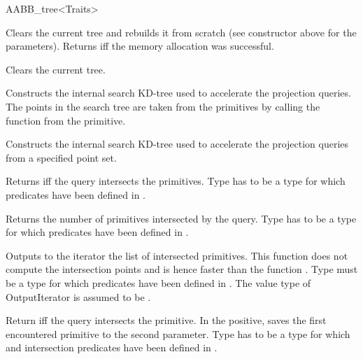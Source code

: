 \begin{ccRefClass}{AABB_tree<Traits>}
\ccOperations

{Clears the current tree and rebuilds it from scratch (see constructor  above for the parameters). Returns  iff the memory allocation was successful. }

{Clears the current tree. }

{ Constructs the internal search KD-tree used to accelerate the projection queries. The points in the search tree are taken from the primitives by calling the function  from the primitive.}

{ Constructs the internal search KD-tree used to accelerate the projection queries from a specified point set. }



{ Returns  iff the query intersects the primitives. Type  has to be a type for which  predicates have been defined in .}
	
{Returns the number of primitives intersected by the query. Type  has to be a type for which  predicates have been defined in .}

{Outputs to the iterator the list of intersected primitives. This function does not compute the intersection points and is hence faster than the function . Type  must be a type for which  predicates have been defined in . The value type of OutputIterator is assumed to be .}

	
{Return  iff the query intersects the primitive. In the positive, saves the first encountered primitive to the second parameter. Type  has to be a type for which  and intersection predicates have been defined in .}


\end{ccRefClass}
